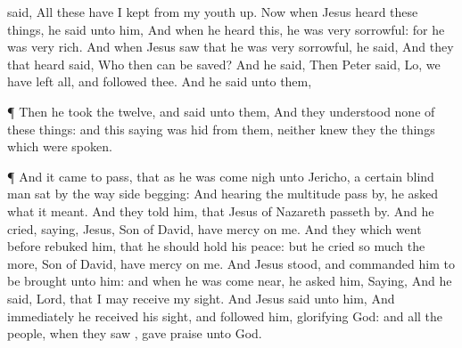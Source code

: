 {said,
All
these have I
kept
from
my youth
up.
Now
when
Jesus
heard these
things, he
said unto
him,
{}
And
when he
heard
this, he
was very
sorrowful:
for he
was
very
rich.
And
when
Jesus saw
that
he
was very
sorrowful, he
said,
{}
And they
that
heard
{}
said,
Who
then
can be
saved?
And he
said,
{}
Then
Peter
said,
Lo,
we have
left
all,
and
followed
thee.
And he
said unto
them,
{}
\par }{\PP {}¶
Then he
took
{} the
twelve, and
said
unto
them,
{}
And
they
understood
none of these
things:
and
this
saying
was
hid
from
them,
neither knew
they the things
which were
spoken.
\par }{\PP {}¶
And it came to
pass, that
as
he was come
nigh
unto
Jericho, a
certain blind
man
sat
by the way
side
begging:
And
hearing the
multitude pass
by, he
asked
what
it
meant.
And they
told
him,
that
Jesus of
Nazareth passeth
by.
And he
cried,
saying,
Jesus,
{}
Son of
David, have
mercy on
me.
And they
which went
before
rebuked
him,
that he should
hold
his
peace:
but he
cried so
much the
more,
{}
Son of
David, have
mercy on
me.
And
Jesus
stood, and
commanded
him to be
brought
unto
him: and
when
he was come
near, he
asked
him,
Saying,
{}
And he
said,
Lord,
that I may receive my
sight.
And
Jesus
said unto
him,
{}
And
immediately he received his
sight,
and
followed
him,
glorifying
God:
and
all the
people, when they
saw
{},
gave
praise unto
God.

}
